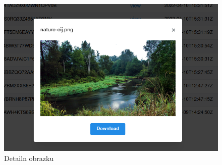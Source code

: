 \begin{figure}
    \centering
    \includegraphics[scale=0.5]{assets/images/image-detail}
    \caption{Detailn obrazku}\label{fig:detail-obrazku}
\end{figure}
